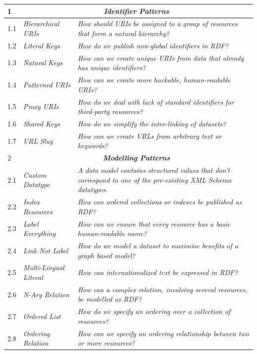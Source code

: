 \begin{longtable}[c]{|l|p{7cm}|p{8cm}|}
\endhead
   1& \multicolumn{2}{|c|}{\textbf{\textit{Identifier Patterns}}}\\ \hline
  1.1 &  \textit{Hierarchical URIs} & \textit{How should URIs be assigned to a group of resources that form a natural hierarchy?}\\ \hline
  1.2 &  \textit{Literal Keys} & \textit{How do we publish non-global identifiers in \gls{RDF}?} \\ \hline
  1.3 &  \textit{Natural Keys} &  \textit{How can we create unique URIs from data that already has unique identifiers?} \\ \hline
  1.4 &  \textit{Patterned URIs} & \textit{How can we create more hackable, human-readable URIs?} \\ \hline
  1.5 &  \textit{Proxy URIs} & \textit{How do we deal with lack of standard identifiers for third-party resources?} \\ \hline
  1.6 &  \textit{Shared Keys} & \textit{How do we simplify the inter-linking of datasets?} \\ \hline
  1.7 &  \textit{URL Slug} &  \textit{How can we create \gls{URL}s from arbitrary text or keywords?} \\ \hline    
    2& \multicolumn{2}{|c|}{\textbf{\textit{Modelling Patterns}}}\\ \hline
  2.1 &  \textit{Custom Datatype} &  \textit{A data model contains structured values that don't correspond to one of the pre-existing \gls{XML Schema} datatypes.} \\ \hline    
  2.2 &  \textit{Index Resources} &  \textit{How can ordered collections or indexes be published as RDF?}  \\ \hline    
  2.3 &  \textit{Label Everything} & \textit{How can we ensure that every resource has a basic human-readable name?} \\ \hline     
  2.4 &  \textit{Link Not Label} &  \textit{How do we model a dataset to maximise benefits of a graph based model?} \\ \hline    
  2.5 &  \textit{Multi-Lingual Literal} & \textit{How can internationalized text be expressed in RDF? }\\ \hline    
  2.6 &  \textit{N-Ary Relation} & \textit{How can a complex relation, involving several resources, be modelled as RDF? }\\ \hline    
  2.7 &  \textit{Ordered List} &  \textit{How do we specify an ordering over a collection of resources?} \\ \hline     
  2.8 &  \textit{Ordering Relation} & \textit{How can we specify an ordering relationship between two or more resources?} \\ \hline     

\end{longtable}
